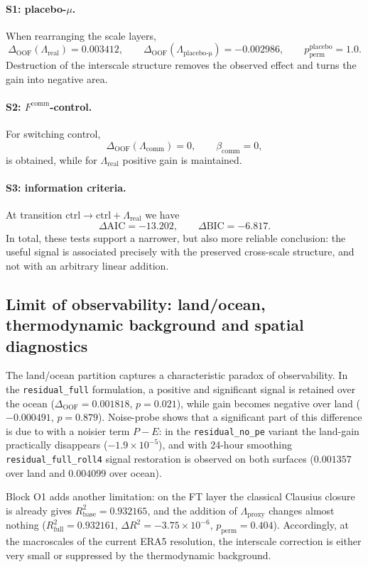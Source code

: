 \documentclass[11pt,a4paper]{article}
\theoremstyle{definition}
\theoremstyle{plain}
\theoremstyle{remark}
\begin{document}
\paragraph{S1: placebo-\(\mu\).}
When rearranging the scale layers,
\[
\Delta_{\mathrm{OOF}}(\Lambda_{\mathrm{real}})=0.003412,\qquad
\Delta_{\mathrm{OOF}}(\Lambda_{\mathrm{placebo\text{-}\mu}})=-0.002986,\qquad
p_{\mathrm{perm}}^{\mathrm{placebo}}=1.0.
\]
Destruction of the interscale structure removes the observed effect and turns the gain into negative area.

\paragraph{S2: \(F^{\mathrm{comm}}\)-control.}
For switching control,
\[
\Delta_{\mathrm{OOF}}(\Lambda_{\mathrm{comm}})=0,\qquad \beta_{\mathrm{comm}}=0,
\]
is obtained, while for \(\Lambda_{\mathrm{real}}\) positive gain is maintained.

\paragraph{S3: information criteria.}
At transition \(\mathrm{ctrl}\to \mathrm{ctrl}+\Lambda_{\mathrm{real}}\) we have
\[
\Delta \mathrm{AIC}=-13.202,\qquad \Delta \mathrm{BIC}=-6.817.
\]
In total, these tests support a narrower, but also more reliable conclusion:
the useful signal is associated precisely with the preserved cross-scale structure, and not with an arbitrary linear addition.

\subsection{Limit of observability: land/ocean, thermodynamic background and spatial diagnostics}

The land/ocean partition captures a characteristic paradox of observability.
In the \texttt{residual\_full} formulation, a positive and significant signal is retained over the ocean
($\Delta_{\mathrm{OOF}}=0.001818$, $p=0.021$),
while gain becomes negative over land
($-0.000491$, $p=0.879$).
Noise-probe shows that a significant part of this difference is due to with a noisier term $P-E$:
in the \texttt{residual\_no\_pe} variant the land-gain practically disappears
($-1.9\times10^{-5}$),
and with 24-hour smoothing \texttt{residual\_full\_roll4} signal restoration is observed on both surfaces
($0.001357$ over land and $0.004099$ over ocean).

Block O1 adds another limitation: on the FT layer the classical Clausius closure is already gives
$R^2_{\mathrm{base}}=0.932165$,
and the addition of $\Lambda_{\mathrm{proxy}}$ changes almost nothing
($R^2_{\mathrm{full}}=0.932161$, $\Delta R^2=-3.75\times10^{-6}$, $p_{\mathrm{perm}}=0.404$).
Accordingly, at the macroscales of the current ERA5 resolution, the interscale correction is either very small or suppressed by the thermodynamic background.
\end{document}
